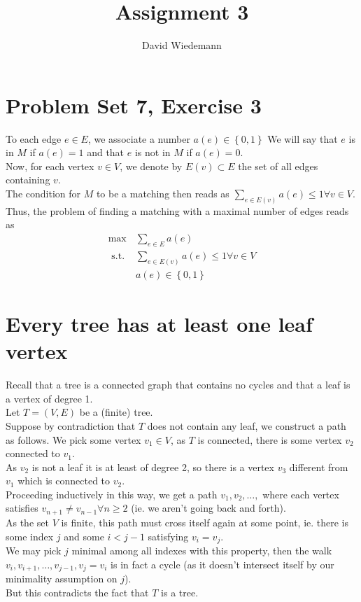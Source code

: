 \message{ !name(Ex.tex)}\documentclass[11pt, a4paper]{article}
\begin{document}

\title{Assignment 3}
\author{David Wiedemann}
\maketitle
\section{Problem Set 7, Exercise 3}
To each edge $e\in E$, we associate a number $a( e ) \in \left\{ 0,1 \right\}  $ 
We will say that $e$ is in $M$ if $a( e ) =1$ and that $e$ is not in $M$ if $a( e  ) =0$.\\
Now, for each vertex $v\in V$, we denote by $E( v) \subset E$ the set of all edges containing $v$.\\
The condition for $M$ to be a matching then reads as $\sum_{ e \in E( v) } a( e )  \leq 1\forall  v \in V$.\\
Thus, the problem of finding a matching with a maximal number of edges reads as
\begin{align*}
	\max & \sum_{ e \in E} a( e  ) \\
	\text{ s.t. } & \sum_{e \in E( v) } a( e ) \leq 1\forall v \in V\\
		      &a( e  ) \in \left\{ 0,1 \right\} 
\end{align*}
\section{Every tree has at least one leaf vertex}
Recall that a tree is a connected graph that contains no cycles and that a leaf is a vertex of degree 1.\\
Let $T= ( V,E) $ be a (finite) tree.\\
Suppose by contradiction that $T$ does not contain any leaf, we construct a path as follows.
We pick some vertex $ v_1\in V$, as $T$ is connected, there is some vertex $v_2$ connected to $v_1$.\\
As $v_2$ is not a leaf it is at least of degree 2, so there is a vertex $v_3$ different from $v_1$ which is connected to $v_2$.\\
Proceeding inductively in this way, we get a path $v_1, v_2,\ldots, $ where each vertex satisfies $v_{n+1} \neq v_{n-1} \forall n \geq 2 $ (ie. we aren't going back and forth).\\
As the set $V$ is finite, this path must cross itself again at some point, ie. there is some index $j$ and some $i< j-1$ satisfying $v_i = v_j$.\\
We may pick $j$ minimal among all indexes with this property, then the walk $v_i, v_{i+1} , \ldots, v_{j-1} , v_j =v_i$ is in fact a cycle (as it doesn't intersect itself by our minimality assumption on $j$).\\
But this contradicts the fact that $T$ is a tree.
\end{document}
